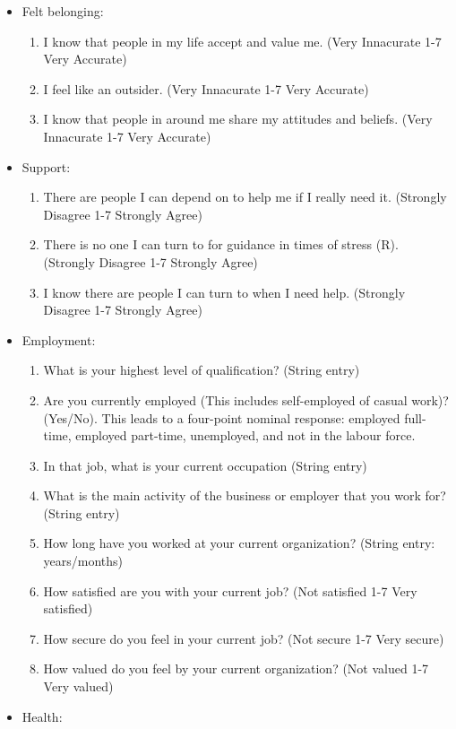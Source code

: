 \documentclass[
  man,
  longtable,
  nolmodern,
  notxfonts,
  notimes,
  colorlinks=true,linkcolor=blue,citecolor=blue,urlcolor=blue]{apa7}
\begin{document}
\begin{itemize}
\item
  Felt belonging:

  \begin{enumerate}
  \def\labelenumi{\arabic{enumi}.}
  \item
    I know that people in my life accept and value me. (Very Innacurate
    1-7 Very Accurate)
  \item
    I feel like an outsider. (Very Innacurate 1-7 Very Accurate)
  \item
    I know that people in around me share my attitudes and beliefs.
    (Very Innacurate 1-7 Very Accurate)
  \end{enumerate}
\item
  Support:

  \begin{enumerate}
  \def\labelenumi{\arabic{enumi}.}
  \item
    There are people I can depend on to help me if I really need it.
    (Strongly Disagree 1-7 Strongly Agree)
  \item
    There is no one I can turn to for guidance in times of stress (R).
    (Strongly Disagree 1-7 Strongly Agree)
  \item
    I know there are people I can turn to when I need help. (Strongly
    Disagree 1-7 Strongly Agree)
  \end{enumerate}
\item
  Employment:

  \begin{enumerate}
  \def\labelenumi{\arabic{enumi}.}
  \item
    What is your highest level of qualification? (String entry)
  \item
    Are you currently employed (This includes self-employed of casual
    work)? (Yes/No). This leads to a four-point nominal response:
    employed full-time, employed part-time, unemployed, and not in the
    labour force.
  \item
    In that job, what is your current occupation (String entry)
  \item
    What is the main activity of the business or employer that you work
    for? (String entry)
  \item
    How long have you worked at your current organization? (String
    entry: years/months)
  \item
    How satisfied are you with your current job? (Not satisfied 1-7 Very
    satisfied)
  \item
    How secure do you feel in your current job? (Not secure 1-7 Very
    secure)
  \item
    How valued do you feel by your current organization? (Not valued 1-7
    Very valued)
  \end{enumerate}
\item
  Health:


\end{itemize}
\end{document}
